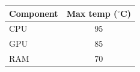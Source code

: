 \begin{table}[htbp]
\centering
\begin{tabular}{lc}
\toprule
Component & \makecell{Max temp \\ ($^\circ$C)} \\
\midrule
CPU & 95 \\
GPU & 85 \\
RAM & 70 \\
\bottomrule
\end{tabular}
\end{table}
